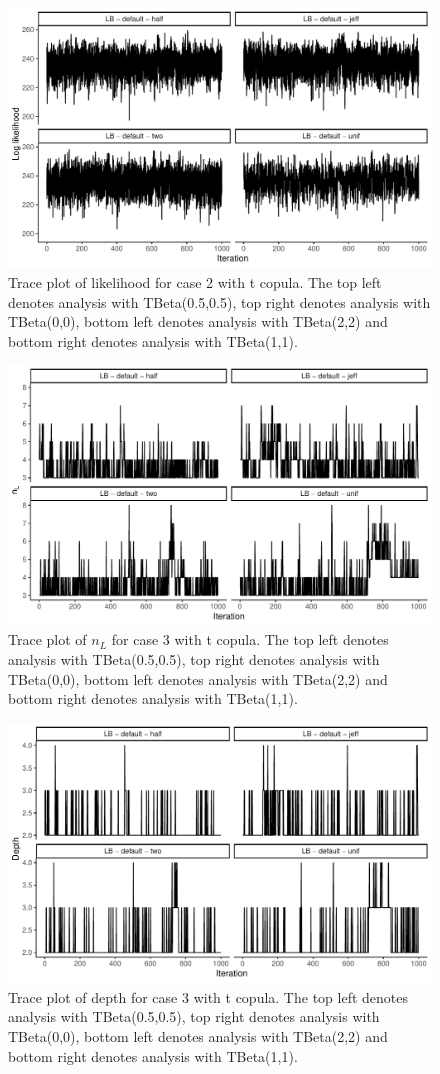 \documentclass{amsart}
\begin{document}
\begin{figure}
	\centering
	\includegraphics[width = 0.75\linewidth]{trace_case2_t_like.pdf}
	\caption{Trace plot of likelihood for case 2 with t copula. The top left denotes analysis with TBeta(0.5,0.5), top right denotes analysis with TBeta(0,0), bottom left denotes analysis with TBeta(2,2) and bottom right denotes analysis with TBeta(1,1).}
	\label{fig:case2:t:like}
\end{figure}

\begin{figure}
	\centering
	\includegraphics[width = 0.75\linewidth]{trace_case3_t_nterm.pdf}
	\caption{Trace plot of $n_L$ for case 3 with t copula. The top left denotes analysis with TBeta(0.5,0.5), top right denotes analysis with TBeta(0,0), bottom left denotes analysis with TBeta(2,2) and bottom right denotes analysis with TBeta(1,1).}
	\label{fig:case3:t:nterm}
\end{figure}

\begin{figure}
	\centering
	\includegraphics[width = 0.75\linewidth]{trace_case3_t_depth.pdf}
	\caption{Trace plot of depth for case 3 with t copula. The top left denotes analysis with TBeta(0.5,0.5), top right denotes analysis with TBeta(0,0), bottom left denotes analysis with TBeta(2,2) and bottom right denotes analysis with TBeta(1,1).}
	\label{fig:case3:t:depth}
\end{figure}
\end{document}
